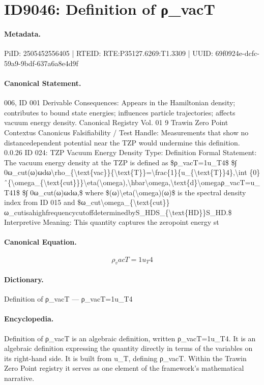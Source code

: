 \section*{ID9046: Definition of ρ\_vacT}
\paragraph{Metadata.}
PiID: 2505452556405 | RTEID: RTE:P35127.6269:T1.3309 | UUID: 69f0924e-dcfc-59a9-9bdf-637a6a8e4d9f

\paragraph{Canonical Statement.}
006, ID 001 Derivable Consequences: Appears in the Hamiltonian density; contributes to bound state energies; influences particle trajectories; affects vacuum energy density. Canonical Registry Vol. 01 9 Trawin Zero Point Contextus Canonicus Falsifiability / Test Handle: Measurements that show no distancedependent potential near the TZP would undermine this definition. 0.0.26 ID 024: TZP Vacuum Energy Density Type: Definition Formal Statement: The vacuum energy density at the TZP is defined as \$ρ\_vacT=1u\_T4\$ \$∫ 0ω\_cut(ω)ωdω\textbackslash{}rho\_\{\textbackslash{}text\{vac\}\}\{\textbackslash{}text\{T\}\}=\textbackslash{}frac\{1\}\{u\_\{\textbackslash{}text\{T\}\}4\},\textbackslash{}int \{0\}ˆ\{\textbackslash{}omega\_\{\textbackslash{}text\{cut\}\}\}\textbackslash{}eta(\textbackslash{}omega),\textbackslash{}hbar\textbackslash{}omega,\textbackslash{}text\{d\}\textbackslash{}omegaρ\_vacT=u\_T41\$ \$∫ 0ω\_cut(ω)ωdω,\$ where \$(ω)\textbackslash{}eta(\textbackslash{}omega)(ω)\$ is the spectral density index from ID 015 and \$ω\_cut\textbackslash{}omega\_\{\textbackslash{}text\{cut\}\}ω\_cutisahighfrequencycutoffdeterminedbyS\_HDS\_\{\textbackslash{}text\{HD\}\}S\_HD.\$ Interpretive Meaning: This quantity captures the zeropoint energy st

\paragraph{Canonical Equation.}
\[
ρ_vacT=1u_T4
\]

\paragraph{Dictionary.}
Definition of ρ\_vacT — ρ\_vacT=1u\_T4

\paragraph{Encyclopedia.}
Definition of ρ\_vacT is an algebraic definition, written ρ\_vacT=1u\_T4. It is an algebraic definition expressing the quantity directly in terms of the variables on its right-hand side. It is built from u\_T, defining ρ\_vacT. Within the Trawin Zero Point registry it serves as one element of the framework's mathematical narrative.
